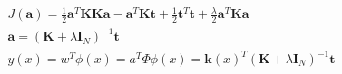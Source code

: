 \documentclass[a4paper]{article}
\begin{document}
\begin{align}
J(\mathbf{a}) = \frac{1}{2} \mathbf{a}^T \mathbf{K} \mathbf{K} \mathbf{a} - \mathbf{a}^T
  \mathbf{K} \mathbf{t} + \frac{1}{2} \mathbf{t}^T
  \mathbf{t} + \frac{\lambda}{2} \mathbf{a}^T \mathbf{K} \mathbf{a}
\\
\mathbf{a} = (\mathbf{K} + \lambda \mathit{\mathbf{I}_N})^{-1} \mathbf{t}
\\
y(x) = w^T\phi(x) = a^T\Phi\phi(x) = \mathbf{k}(x)^T (\mathbf{K} +
  \lambda \mathit{\mathbf{I}_N})^{-1} \mathbf{t}
\end{align}
\end{document}
